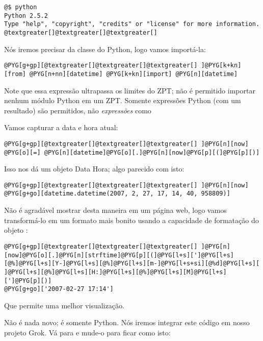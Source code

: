 \documentclass[a4paper,12pt,portuguese]{manual}
\begin{document}
\begin{Verbatim}[commandchars=@\[\]]
@$ python
Python 2.5.2
Type "help", "copyright", "credits" or "license" for more information.
@textgreater[]@textgreater[]@textgreater[]
\end{Verbatim}

Nós iremos precisar da classe  do Python, logo vamos
importá-la:

\begin{Verbatim}[commandchars=@\[\]]
@PYG[g+gp][@textgreater[]@textgreater[]@textgreater[] ]@PYG[k+kn][from] @PYG[n+nn][datetime] @PYG[k+kn][import] @PYG[n][datetime]
\end{Verbatim}

Note que essa expressão ultrapassa os limites do ZPT; não é permitido
importar nenhum módulo Python em um ZPT. Somente expressões Python
(com um resultado) são permitidos, não \emph{expressões}
como 

Vamos capturar a data e hora atual:

\begin{Verbatim}[commandchars=@\[\]]
@PYG[g+gp][@textgreater[]@textgreater[]@textgreater[] ]@PYG[n][now] @PYG[o][=] @PYG[n][datetime]@PYG[o][.]@PYG[n][now]@PYG[p][(]@PYG[p][)]
\end{Verbatim}

Isso nos dá um objeto Data Hora; algo parecido com isto:

\begin{Verbatim}[commandchars=@\[\]]
@PYG[g+gp][@textgreater[]@textgreater[]@textgreater[] ]@PYG[n][now]
@PYG[g+go][datetime.datetime(2007, 2, 27, 17, 14, 40, 958809)]
\end{Verbatim}

Não é agradável mostrar desta maneira em um página web, logo vamos
transformá-lo em um formato mais bonito usando a capacidade de
formatação do objeto :

\begin{Verbatim}[commandchars=@\[\]]
@PYG[g+gp][@textgreater[]@textgreater[]@textgreater[] ]@PYG[n][now]@PYG[o][.]@PYG[n][strftime]@PYG[p][(]@PYG[l+s][']@PYG[l+s][@%]@PYG[l+s][Y-]@PYG[l+s][@%]@PYG[l+s][m-]@PYG[l+s+si][@%d]@PYG[l+s][ ]@PYG[l+s][@%]@PYG[l+s][H:]@PYG[l+s][@%]@PYG[l+s][M]@PYG[l+s][']@PYG[p][)]
@PYG[g+go]['2007-02-27 17:14']
\end{Verbatim}

Que permite uma melhor visualização.

Não é nada novo; é somente Python. Nós iremos integrar este código em
nosso projeto Grok. Vá para  e mude-o para ficar como isto:
\end{document}
